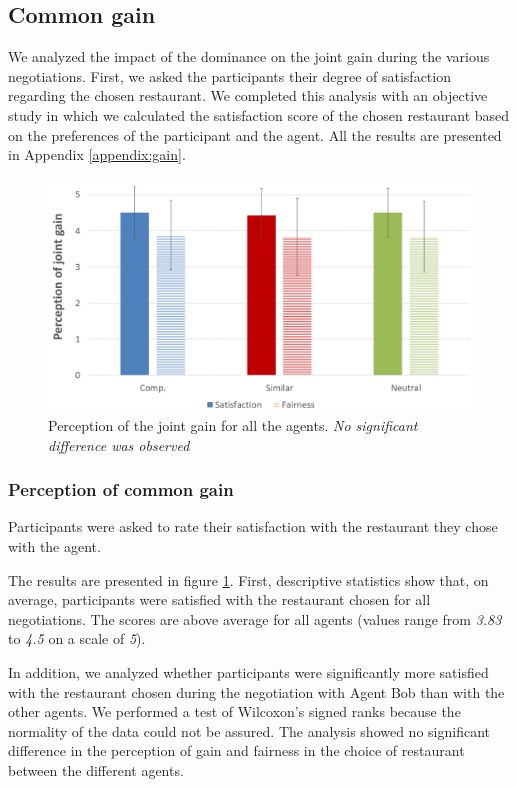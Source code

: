 \documentclass{llncs}
\begin{document}
\subsection{Common gain}
We analyzed the impact of the dominance on the joint gain during the various negotiations. First, we asked the participants their degree of satisfaction regarding the chosen restaurant. We completed this analysis with an objective study in which we calculated the satisfaction score of the chosen restaurant based on the preferences of the participant and the agent. All the results are presented in Appendix \ref{appendix:gain}.

\begin{figure}[h]
	
	\centering
	\includegraphics[width= 0.65 \linewidth,clip=false]{figs/percpGain.PNG}
	\caption{Perception of the joint gain for all the agents. \textit{No significant difference was observed}}
	\label{fig:gainCom}
\end{figure}

\subsubsection{Perception of common gain}
Participants were asked to rate their satisfaction with the restaurant they chose with the agent.

The results are presented in figure \ref{fig:gainCom}. First, descriptive statistics show that, on average, participants were satisfied with the restaurant chosen for all negotiations. The scores are above average for all agents (values range from \emph{3.83} to \emph{4.5} on a scale of \emph{5}). 

In addition, we analyzed whether participants were significantly more satisfied with the restaurant chosen during the negotiation with Agent Bob than with the other agents. We performed a test of Wilcoxon's signed ranks because the normality of the data could not be assured. The analysis showed no significant difference in the perception of gain and fairness in the choice of restaurant between the different agents. 
\end{document}
